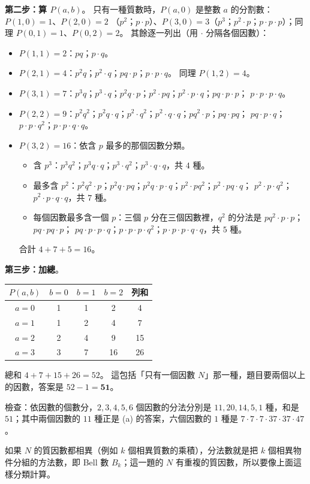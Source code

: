 \begin{pastsoln}
\textbf{第二步：算 $P(a, b)$}。 只有一種質數時，$P(a, 0)$ 是整數 $a$ 的分割數：$P(1, 0) = 1$、$P(2, 0) = 2$
（$p^2$；$p \cdot p$）、$P(3, 0) = 3$（$p^3$；$p^2 \cdot p$；$p \cdot p \cdot p$）；同理 $P(0, 1) = 1$、$P(0, 2) = 2$。
其餘逐一列出（用 $\cdot$ 分隔各個因數）：
\begin{itemize}
\item $P(1, 1) = 2$：$pq$；$p \cdot q$。
\item $P(2, 1) = 4$：$p^2 q$；$p^2 \cdot q$；$pq \cdot p$；$p \cdot p \cdot q$。 同理 $P(1, 2) = 4$。
\item $P(3, 1) = 7$：$p^3 q$；$p^3 \cdot q$；$p^2 q \cdot p$；$p^2 \cdot pq$；$p^2 \cdot p \cdot q$；$pq \cdot p \cdot p$；
$p \cdot p \cdot p \cdot q$。
\item $P(2, 2) = 9$：$p^2 q^2$；$p^2 q \cdot q$；$p^2 \cdot q^2$；$p^2 \cdot q \cdot q$；$pq^2 \cdot p$；$pq \cdot pq$；
$pq \cdot p \cdot q$；$p \cdot p \cdot q^2$；$p \cdot p \cdot q \cdot q$。
\item $P(3, 2) = 16$：依含 $p$ 最多的那個因數分類。
  \begin{itemize}
  \item 含 $p^3$：$p^3 q^2$；$p^3 q \cdot q$；$p^3 \cdot q^2$；$p^3 \cdot q \cdot q$，共 $4$ 種。
  \item 最多含 $p^2$：$p^2 q^2 \cdot p$；$p^2 q \cdot pq$；$p^2 q \cdot p \cdot q$；$p^2 \cdot pq^2$；$p^2 \cdot pq \cdot q$；
  $p^2 \cdot p \cdot q^2$；$p^2 \cdot p \cdot q \cdot q$，共 $7$ 種。
  \item 每個因數最多含一個 $p$：三個 $p$ 分在三個因數裡，$q^2$ 的分法是 $pq^2 \cdot p \cdot p$；$pq \cdot pq \cdot p$；
  $pq \cdot p \cdot p \cdot q$；$p \cdot p \cdot p \cdot q^2$；$p \cdot p \cdot p \cdot q \cdot q$，共 $5$ 種。
  \end{itemize}
  合計 $4 + 7 + 5 = 16$。
\end{itemize}

\textbf{第三步：加總}。
\begin{center}
\begin{tabular}{c|ccc|c}
\toprule
$P(a, b)$ & $b = 0$ & $b = 1$ & $b = 2$ & 列和 \\
\midrule
$a = 0$ & 1 & 1 & 2 & 4 \\
$a = 1$ & 1 & 2 & 4 & 7 \\
$a = 2$ & 2 & 4 & 9 & 15 \\
$a = 3$ & 3 & 7 & 16 & 26 \\
\bottomrule
\end{tabular}
\end{center}
總和 $4 + 7 + 15 + 26 = 52$。 這包括「只有一個因數 $N$」那一種，題目要兩個以上的因數，答案是
$52 - 1 = \mathbf{51}$。

檢查：依因數的個數分，$2, 3, 4, 5, 6$ 個因數的分法分別是 $11, 20, 14, 5, 1$ 種，和是 $51$；其中兩個因數的
$11$ 種正是 (a) 的答案，六個因數的 $1$ 種是 $7 \cdot 7 \cdot 7 \cdot 37 \cdot 37 \cdot 47$。

如果 $N$ 的質因數都相異（例如 $k$ 個相異質數的乘積），分法數就是把 $k$ 個相異物件分組的方法數，即
Bell 數 $B_k$；這一題的 $N$ 有重複的質因數，所以要像上面這樣分類計算。
\end{pastsoln}
